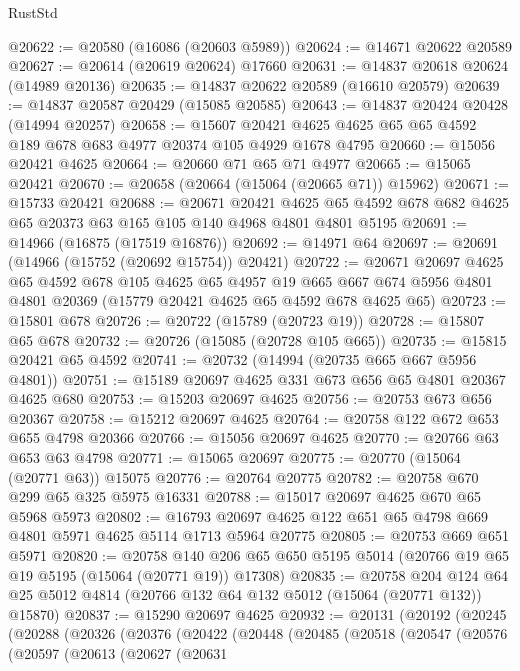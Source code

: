 \begin{lexlean}{RustStd}
\begin{coremodule}
@20622 := @20580 (@16086 (@20603 @5989))
@20624 := @14671 @20622 @20589
@20627 := @20614 (@20619 @20624) @17660
@20631 := @14837 @20618 @20624 (@14989 @20136)
@20635 := @14837 @20622 @20589 (@16610 @20579)
@20639 := @14837 @20587 @20429 (@15085 @20585)
@20643 := @14837 @20424 @20428 (@14994 @20257)
@20658 := @15607 @20421 @4625 @4625 @65 @65 @4592 @189 @678 @683 @4977 @20374 @105 @4929 @1678 @4795
@20660 := @15056 @20421 @4625
@20664 := @20660 @71 @65 @71 @4977
@20665 := @15065 @20421
@20670 := @20658 (@20664 (@15064 (@20665 @71)) @15962)
@20671 := @15733 @20421
@20688 := @20671
    @20421
    @4625
    @65
    @4592
    @678
    @682
    @4625
    @65
    @20373
    @63
    @165
    @105
    @140
    @4968
    @4801
    @4801
    @5195
@20691 := @14966 (@16875 (@17519 @16876))
@20692 := @14971 @64
@20697 := @20691 (@14966 (@15752 (@20692 @15754)) @20421)
@20722 := @20671
    @20697
    @4625
    @65
    @4592
    @678
    @105
    @4625
    @65
    @4957
    @19
    @665
    @667
    @674
    @5956
    @4801
    @4801
    @20369
    (@15779 @20421 @4625 @65 @4592 @678 @4625 @65)
@20723 := @15801 @678
@20726 := @20722 (@15789 (@20723 @19))
@20728 := @15807 @65 @678
@20732 := @20726 (@15085 (@20728 @105 @665))
@20735 := @15815 @20421 @65 @4592
@20741 := @20732 (@14994 (@20735 @665 @667 @5956 @4801))
@20751 := @15189 @20697 @4625 @331 @673 @656 @65 @4801 @20367 @4625 @680
@20753 := @15203 @20697 @4625
@20756 := @20753 @673 @656 @20367
@20758 := @15212 @20697 @4625
@20764 := @20758 @122 @672 @653 @655 @4798 @20366
@20766 := @15056 @20697 @4625
@20770 := @20766 @63 @653 @63 @4798
@20771 := @15065 @20697
@20775 := @20770 (@15064 (@20771 @63)) @15075
@20776 := @20764 @20775
@20782 := @20758 @670 @299 @65 @325 @5975 @16331
@20788 := @15017 @20697 @4625 @670 @65 @5968 @5973
@20802 := @16793 @20697 @4625 @122 @651 @65 @4798 @669 @4801 @5971 @4625 @5114 @1713 @5964 @20775
@20805 := @20753 @669 @651 @5971
@20820 := @20758
    @140
    @206
    @65
    @650
    @5195
    @5014
    (@20766 @19 @65 @19 @5195 (@15064 (@20771 @19)) @17308)
@20835 := @20758
    @204
    @124
    @64
    @25
    @5012
    @4814
    (@20766 @132 @64 @132 @5012 (@15064 (@20771 @132)) @15870)
@20837 := @15290 @20697 @4625
@20932 := @20131
    (@20192
      (@20245
        (@20288
          (@20326
            (@20376
              (@20422
                (@20448
                  (@20485
                    (@20518
                      (@20547
                        (@20576
                          (@20597
                            (@20613
                              (@20627
                                (@20631

\end{coremodule}
\end{lexlean}
